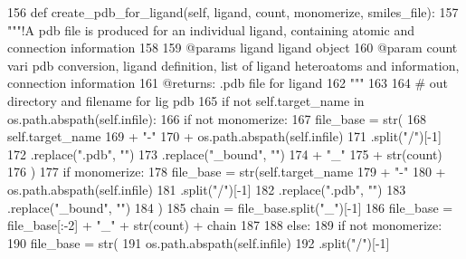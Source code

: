 \begin{DoxyCode}
156     \textcolor{keyword}{def }create\_pdb\_for\_ligand(self, ligand, count, monomerize, smiles\_file):
157         \textcolor{stringliteral}{"""!A pdb file is produced for an individual ligand, containing atomic and connection information}
158 \textcolor{stringliteral}{}
159 \textcolor{stringliteral}{        @params ligand ligand object }
160 \textcolor{stringliteral}{        @param count  vari pdb conversion, ligand definition, list of ligand heteroatoms and information,
       connection information}
161 \textcolor{stringliteral}{        @returns: .pdb file for ligand}
162 \textcolor{stringliteral}{        """}
163 
164         \textcolor{comment}{# out directory and filename for lig pdb}
165         \textcolor{keywordflow}{if} \textcolor{keywordflow}{not} self.target\_name \textcolor{keywordflow}{in} os.path.abspath(self.infile):
166             \textcolor{keywordflow}{if} \textcolor{keywordflow}{not} monomerize:
167                 file\_base = str(
168                     self.target\_name
169                     + \textcolor{stringliteral}{"-"}
170                     + os.path.abspath(self.infile)
171                     .split(\textcolor{stringliteral}{"/"})[-1]
172                     .replace(\textcolor{stringliteral}{".pdb"}, \textcolor{stringliteral}{""})
173                     .replace(\textcolor{stringliteral}{"\_bound"}, \textcolor{stringliteral}{""})
174                     + \textcolor{stringliteral}{"\_"}
175                     + str(count)
176                 )
177             \textcolor{keywordflow}{if} monomerize:
178                 file\_base = str(self.target\_name
179                                 + \textcolor{stringliteral}{"-"}
180                                 + os.path.abspath(self.infile)
181                                 .split(\textcolor{stringliteral}{"/"})[-1]
182                                 .replace(\textcolor{stringliteral}{".pdb"}, \textcolor{stringliteral}{""})
183                                 .replace(\textcolor{stringliteral}{"\_bound"}, \textcolor{stringliteral}{""})
184                                 )
185                 chain = file\_base.split(\textcolor{stringliteral}{"\_"})[-1]
186                 file\_base = file\_base[:-2] + \textcolor{stringliteral}{"\_"} + str(count) + chain
187 
188         \textcolor{keywordflow}{else}:
189             \textcolor{keywordflow}{if} \textcolor{keywordflow}{not} monomerize:
190                 file\_base = str(
191                                 os.path.abspath(self.infile)
192                                 .split(\textcolor{stringliteral}{"/"})[-1]

\end{DoxyCode}
